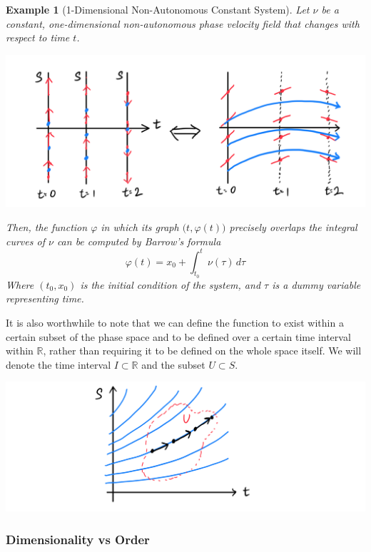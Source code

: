 \documentclass{article}
\newtheorem{example}{Example}[section]
\theoremstyle{remark}
\theoremstyle{definition}
\begin{document}
    \begin{example}[1-Dimensional Non-Autonomous Constant System]
    Let $\nu$ be a constant, one-dimensional non-autonomous phase velocity field that changes with respect to time $t$. 
    \begin{center}
        \includegraphics[scale=0.25]{img/Nonauto_constant_field.PNG}
    \end{center}
    Then, the function $\varphi$ in which its graph $\big( t, \varphi(t)\big)$ precisely overlaps the integral curves of $\nu$ can be computed by \textit{Barrow's formula}
    \[\varphi(t) = x_0 + \int_{t_0}^t \nu(\tau)\, d\tau\]
    Where $(t_0, x_0)$ is the initial condition of the system, and $\tau$ is a dummy variable representing time. 
    \end{example}

    It is also worthwhile to note that we can define the function to exist within a certain subset of the phase space and to be defined over a certain time interval within $\mathbb{R}$, rather than requiring it to be defined on the whole space itself. We will denote the time interval $I \subset \mathbb{R}$ and the subset $U \subset S$. 
    \begin{center}
        \includegraphics[scale=0.25]{img/ODE_in_open_set.PNG}
    \end{center}

    \subsubsection{Dimensionality vs Order}
\end{document}
